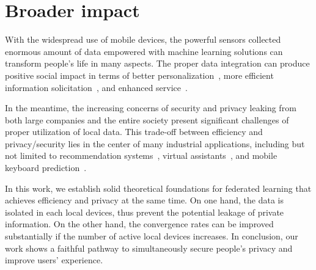 
\section{Broader impact}
With the widespread use of mobile devices, the powerful sensors
collected enormous amount of data empowered with machine learning
solutions can transform people's life in many aspects. The proper
data integration can produce positive social
impact in terms of better personalization~\cite{fallah2020personalized}, more efficient information solicitation~\cite{chen2018federated}, and enhanced service~\cite{47586}.

In the meantime, the increasing concerns of security and
privacy leaking from both large companies and the entire society
present significant challenges of proper utilization of local
data. This trade-off between efficiency and privacy/security
lies in the center of many industrial applications, including 
but not limited to recommendation systems~\cite{chen2018federated}, virtual assistants~\cite{lamautonomy}, and mobile keyboard prediction~\cite{47586}.

In this work, we establish solid theoretical foundations for federated
learning that achieves efficiency and privacy at the same time. 
On one hand, the data is isolated in each local devices, thus prevent
the potential leakage of private information. On the other hand, the
convergence rates can be improved substantially if the number of
active local devices increases. In conclusion, our work 
shows a faithful pathway to simultaneously secure people's privacy and improve
users' experience.



